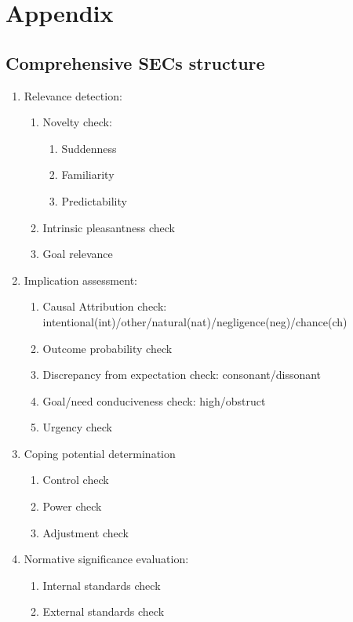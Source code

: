 \section{Appendix}

\subsection{Comprehensive SECs structure}

\begin{enumerate}
 \item  Relevance detection:
 \begin{enumerate}
  \item  Novelty check:
  \begin{enumerate}
   \item  Suddenness
   \item  Familiarity
   \item  Predictability
  \end{enumerate}
  \item  Intrinsic pleasantness check
  \item  Goal relevance
 \end{enumerate}
 \item  Implication assessment:
 \begin{enumerate}
  \item  Causal Attribution check: intentional(int)/other/natural(nat)/negligence(neg)/chance(ch)
  \item  Outcome probability check
  \item  Discrepancy from expectation check: consonant/dissonant
  \item  Goal/need conduciveness check: high/obstruct
  \item  Urgency check
 \end{enumerate}
 \item  Coping potential determination
 \begin{enumerate}
  \item  Control check
  \item  Power check
  \item  Adjustment check
 \end{enumerate}
 \item  Normative significance evaluation:
 \begin{enumerate}
  \item  Internal standards check
  \item  External standards check
 \end{enumerate}
\end{enumerate}

